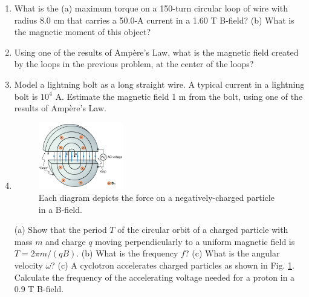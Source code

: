 \documentclass[10pt]{article}
\begin{document}
\begin{enumerate}
\begin{enumerate}
\item What is the (a) maximum torque on a 150-turn circular loop of wire with radius 8.0 cm that carries a 50.0-A current in a 1.60 T B-field? (b) What is the magnetic moment of this object? \\ \vspace{2 cm}
\item Using one of the results of Amp\`{e}re's Law, what is the magnetic field created by the loops in the previous problem, at the center of the loops? \\ \vspace{2cm}
\item Model a lightning bolt as a long straight wire.  A typical current in a lightning bolt is $10^4$ A. Estimate the magnetic field 1 m from the bolt, using one of the results of Amp\`{e}re's Law. \\ \vspace{2cm}
\item 
\begin{figure}[hb]
\centering
\includegraphics[width=0.35\textwidth]{cyclo.png}
\caption{\label{fig:cyclo} Each diagram depicts the force on a negatively-charged particle in a B-field.}
\end{figure}
(a) Show that the period $T$ of the circular orbit of a charged particle with mass $m$ and charge $q$ moving perpendicularly to a uniform magnetic field is $T = 2\pi m/(qB)$. (b) What is the frequency $f$? (c) What is the angular velocity $\omega$?  (c) A cyclotron accelerates charged particles as shown in Fig. \ref{fig:cyclo}. Calculate the frequency of the accelerating voltage needed for a proton in a 0.9 T B-field.
\end{enumerate}
\end{enumerate}
\end{document}
